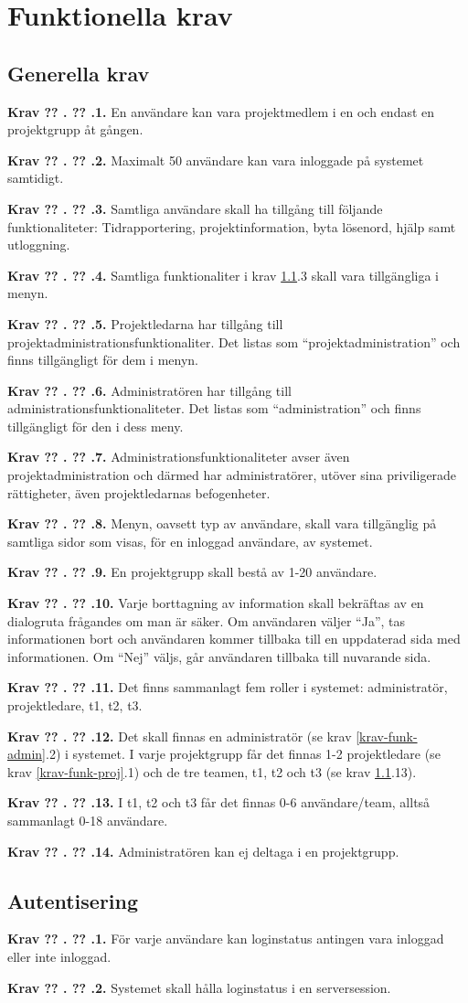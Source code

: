 \documentclass[a4paper]{article}
\newcommand\getcurrentref[1]{%
 \ifnumequal{\value{#1}}{0}
  {??}
  {\the\value{#1}}%
}
\newcommand\requirement[2]{
	\numberedrow{Krav}{#1}{#2}
}
\newcommand\numberedrow[3]{
	\noindent
	\textbf{#1 \getcurrentref{section}.\getcurrentref{subsection}.#2.} #3
	
}
\begin{document}
\section{Funktionella krav}
\subsection{Generella krav}
\label{krav-funk-gen}

\requirement{1}{En användare kan vara projektmedlem i en och endast en projektgrupp åt gången.}
\requirement{2}{Maximalt 50 användare kan vara inloggade på systemet samtidigt.}
\requirement{3}{Samtliga användare skall ha tillgång till följande funktionaliteter: Tidrapportering, projektinformation, byta lösenord, hjälp samt utloggning.}
\requirement{4}{Samtliga funktionaliter i krav \ref{krav-funk-gen}.3 skall vara tillgängliga i menyn.}
\requirement{5}{Projektledarna har tillgång till projektadministrationsfunktionaliter. Det listas som ``projektadministration'' och finns tillgängligt för dem i menyn.}
\requirement{6}{Administratören har tillgång till administrationsfunktionaliteter. Det listas som ``administration'' och finns tillgängligt för den i dess meny.}
\requirement{7}{Administrationsfunktionaliteter avser även projektadministration och därmed har administratörer, utöver sina priviligerade rättigheter, även projektledarnas befogenheter.}
\requirement{8}{Menyn, oavsett typ av användare, skall vara tillgänglig på samtliga sidor som visas, för en inloggad användare, av systemet.}
\requirement{9}{En projektgrupp skall bestå av 1-20 användare.}
\requirement{10}{Varje borttagning av information skall bekräftas av en dialogruta frågandes om man är säker. Om användaren väljer ``Ja'', tas informationen bort och användaren kommer tillbaka till en uppdaterad sida med informationen. Om ``Nej'' väljs, går användaren tillbaka till nuvarande sida.}
\requirement{11}{Det finns sammanlagt fem roller i systemet: administratör, projektledare, t1, t2, t3.}
\requirement{12}{Det skall finnas en administratör (se krav \ref{krav-funk-admin}.2) i systemet. I varje projektgrupp får det finnas 1-2 projektledare (se krav \ref{krav-funk-proj}.1) och de tre teamen, t1, t2 och t3 (se krav \ref{krav-funk-gen}.13).}
\requirement{13}{I t1, t2 och t3 får det finnas 0-6 användare/team, alltså sammanlagt 0-18 användare.}
\requirement{14}{Administratören kan ej deltaga i en projektgrupp.}

\subsection{Autentisering}
\label{krav-funk-aut}
\requirement{1}{För varje användare kan loginstatus antingen vara inloggad eller inte inloggad.}
\requirement{2}{Systemet skall hålla loginstatus i en serversession.}
\end{document}
